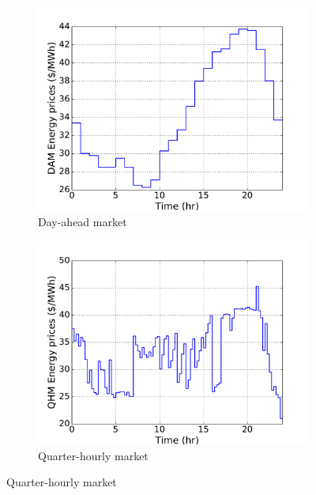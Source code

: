 \documentclass[11pt,twoside]{article}
\begin{document}
\begin{figure}[h!tp]
\centering
\begin{subfigure}[b]{0.32\textwidth} \includegraphics[width=\textwidth]{Figures/damprices.pdf} \caption{Day-ahead market}\label{damprices} \end{subfigure} \hfill
\begin{subfigure}[b]{0.32\textwidth} \includegraphics[width=\textwidth]{Figures/qhmprices.pdf} \caption{Quarter-hourly market}\label{qhmprices} \end{subfigure} \hfill

\end{figure}
\end{document}
